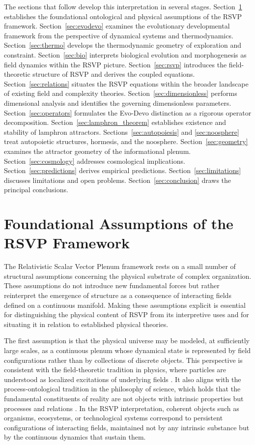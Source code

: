 \documentclass[12pt]{article}
\begin{document}
The sections that follow develop this interpretation in several stages. Section~\ref{sec:assumptions} establishes the foundational ontological and physical assumptions of the RSVP framework. Section~\ref{sec:evodevo} examines the evolutionary developmental framework from the perspective of dynamical systems and thermodynamics. Section~\ref{sec:thermo} develops the thermodynamic geometry of exploration and constraint. Section~\ref{sec:bio} interprets biological evolution and morphogenesis as field dynamics within the RSVP picture. Section~\ref{sec:rsvp} introduces the field-theoretic structure of RSVP and derives the coupled equations. Section~\ref{sec:relations} situates the RSVP equations within the broader landscape of existing field and complexity theories. Section~\ref{sec:dimensionless} performs dimensional analysis and identifies the governing dimensionless parameters. Section~\ref{sec:operators} formulates the Evo-Devo distinction as a rigorous operator decomposition. Section~\ref{sec:lamphron_theorem} establishes existence and stability of lamphron attractors. Sections~\ref{sec:autopoiesis} and \ref{sec:noosphere} treat autopoietic structures, hormesis, and the noosphere. Section~\ref{sec:geometry} examines the attractor geometry of the informational plenum. Section~\ref{sec:cosmology} addresses cosmological implications. Section~\ref{sec:predictions} derives empirical predictions. Section~\ref{sec:limitations} discusses limitations and open problems. Section~\ref{sec:conclusion} draws the principal conclusions.

\section{Foundational Assumptions of the RSVP Framework}
\label{sec:assumptions}

The Relativistic Scalar Vector Plenum framework rests on a small number of structural assumptions concerning the physical substrate of complex organization. These assumptions do not introduce new fundamental forces but rather reinterpret the emergence of structure as a consequence of interacting fields defined on a continuous manifold. Making these assumptions explicit is essential for distinguishing the physical content of RSVP from its interpretive uses and for situating it in relation to established physical theories.

The first assumption is that the physical universe may be modeled, at sufficiently large scales, as a continuous plenum whose dynamical state is represented by field configurations rather than by collections of discrete objects. This perspective is consistent with the field-theoretic tradition in physics, where particles are understood as localized excitations of underlying fields \cite{smolin2006,tegmark2014}. It also aligns with the process-ontological tradition in the philosophy of science, which holds that the fundamental constituents of reality are not objects with intrinsic properties but processes and relations \cite{prigogine1984,smithmorowitz2016}. In the RSVP interpretation, coherent objects such as organisms, ecosystems, or technological systems correspond to persistent configurations of interacting fields, maintained not by any intrinsic substance but by the continuous dynamics that sustain them.
\end{document}
